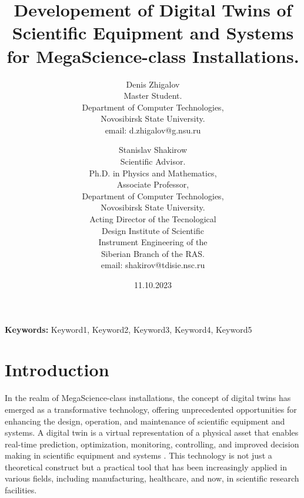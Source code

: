 \documentclass[12pt]{article}
\begin{document}
\title{Developement of Digital Twins of Scientific Equipment and Systems for MegaScience-class Installations.}
\author{
  Denis Zhigalov\\ 
  \small{Master Student.} \\ 
  \small{Department of Computer Technologies,} \\ 
  \small{Novosibirsk State University.} \\
  \small{email: d.zhigalov@g.nsu.ru}
  \and 
  Stanislav Shakirow \\ 
  \small{Scientific Advisor.} \\
  \small{Ph.D. in Physics and Mathematics,} \\
  \small{Associate Professor,} \\
  \small{Department of Computer Technologies,} \\ 
  \small{Novosibirsk State University.} \\
  \small {Acting Director of the Tecnological} \\ 
  \small {Design Institute of Scientific} \\
  \small{Instrument Engineering of the} \\
  \small{Siberian Branch of the RAS.} \\
  \small{email: shakirov@tdisie.nsc.ru}
}
\date{11.10.2023}
\maketitle


\begin{abstract}
\end{abstract}

\textbf{Keywords:} Keyword1, Keyword2, Keyword3, Keyword4, Keyword5

\section{Introduction}
In the realm of MegaScience-class installations, the concept of digital twins
has emerged as a transformative technology, offering unprecedented
opportunities for enhancing the design, operation, and maintenance of
scientific equipment and systems. A digital twin is a virtual representation of
a physical asset that enables real-time prediction, optimization, monitoring,
controlling, and improved decision making in scientific equipment and systems
\cite{Rasheed2020Digital}. This technology is not just a theoretical construct
but a practical tool that has been increasingly applied in various fields,
including manufacturing, healthcare, and now, in scientific research
facilities.
\end{document}
